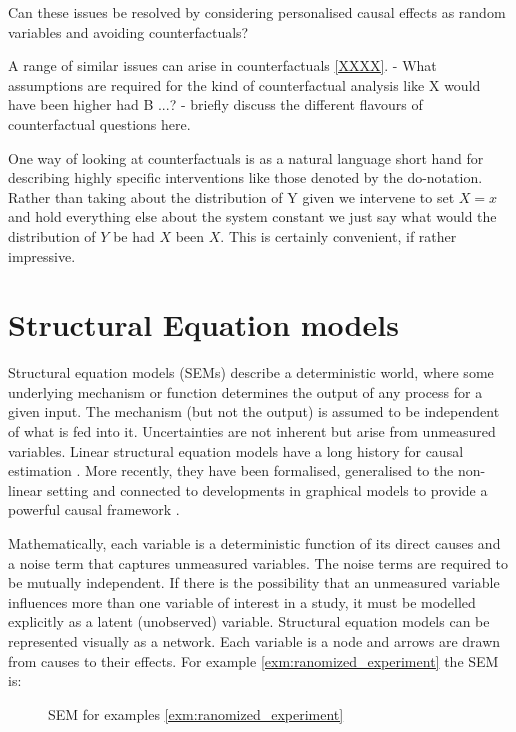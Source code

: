 \documentclass[11pt,a4paper,oneside]{book}
\theoremstyle{plain}
\theoremstyle{definition}
\let\epsilon\varepsilon
\begin{document}
Can these issues be resolved by considering personalised causal effects as random variables and avoiding counterfactuals?

A range of similar issues can arise in counterfactuals \ref{XXXX}. 
- What assumptions are required for the kind of counterfactual analysis like X would have been higher had B ...?
- briefly discuss the different flavours of counterfactual questions here. 

One way of looking at counterfactuals is as a natural language short hand for describing highly specific interventions like those denoted by the do-notation. Rather than taking about the distribution of Y given we intervene to set $X=x$ and hold everything else about the system constant we just say what would the distribution of $Y$ be had $X$ been $X$. This is certainly convenient, if rather impressive. 

\section{Structural Equation models}
\label{sec:SEM}

Structural equation models (SEMs) describe a deterministic world, where some underlying mechanism or function determines the output of any process for a given input. The mechanism (but not the output) is assumed to be independent of what is fed into it. Uncertainties are not inherent but arise from unmeasured variables. Linear structural equation models have a long history for causal estimation \cite {Wright1921,Haavelmo1943}. More recently, they have been formalised, generalised to the non-linear setting and connected to developments in graphical models to provide a powerful causal framework \cite{Pearl2000}.

Mathematically, each variable is a deterministic function of its direct causes and a noise term that captures unmeasured variables. The noise terms are required to be mutually independent. If there is the possibility that an unmeasured variable influences more than one variable of interest in a study, it must be modelled explicitly as a latent (unobserved) variable. Structural equation models can be represented visually as a network. Each variable is a node and arrows are drawn from causes to their effects. For example \ref{exm:ranomized_experiment} the SEM is:


\begin{figure}[h]
\caption{SEM for examples \ref{exm:ranomized_experiment}}
\label{fig:causal_network_example2}
\centering
{}
\end{figure}
\end{document}
